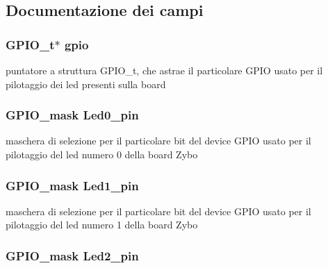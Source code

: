 \subsection{Documentazione dei campi}
\hypertarget{struct_zybo_led__t_acb3116190992a4d8d26545c103304d27}{
\subsubsection[{gpio}]{\setlength{\rightskip}{0pt plus 5cm}G\+P\+I\+O\+\_\+t$\ast$ gpio}}\label{struct_zybo_led__t_acb3116190992a4d8d26545c103304d27}
puntatore a struttura G\+P\+I\+O\+\_\+t, che astrae il particolare G\+P\+I\+O usato per il pilotaggio dei led presenti sulla board \hypertarget{struct_zybo_led__t_aa4d077e557e43132a3100ab30b60165c}{
\subsubsection[{Led0\+\_\+pin}]{\setlength{\rightskip}{0pt plus 5cm}G\+P\+I\+O\+\_\+mask Led0\+\_\+pin}}\label{struct_zybo_led__t_aa4d077e557e43132a3100ab30b60165c}
maschera di selezione per il particolare bit del device G\+P\+I\+O usato per il pilotaggio del led numero 0 della board Zybo \hypertarget{struct_zybo_led__t_a2ee8b92c08972eb1b5bb1b72f4a9d305}{
\subsubsection[{Led1\+\_\+pin}]{\setlength{\rightskip}{0pt plus 5cm}G\+P\+I\+O\+\_\+mask Led1\+\_\+pin}}\label{struct_zybo_led__t_a2ee8b92c08972eb1b5bb1b72f4a9d305}
maschera di selezione per il particolare bit del device G\+P\+I\+O usato per il pilotaggio del led numero 1 della board Zybo \hypertarget{struct_zybo_led__t_a566ca7784af030de3be9244c99066a5c}{
\subsubsection[{Led2\+\_\+pin}]{\setlength{\rightskip}{0pt plus 5cm}G\+P\+I\+O\+\_\+mask Led2\+\_\+pin}}\label{struct_zybo_led__t_a566ca7784af030de3be9244c99066a5c}
